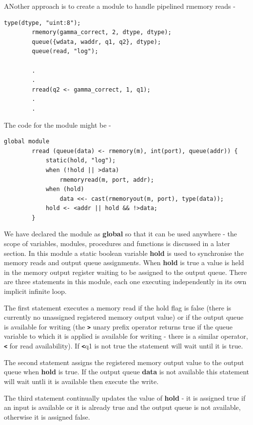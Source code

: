 \documentclass[10pt,a4paper,twoside,fleqn]{article}
\newcommand{\kwd}[1]{{\bf #1}} %
\newcommand{\var}[1]{{\bf #1}} %
\begin{document}
    ANother approach is to create a module to handle pipelined
    rmemory reads -
    \begin{lstlisting}[language=threepl]
        type(dtype, "uint:8");
        rmemory(gamma_correct, 2, dtype, dtype);
        queue({wdata, waddr, q1, q2}, dtype);
        queue(read, "log");
                
        .
        .
        rread(q2 <- gamma_correct, 1, q1);
        .
        .
    \end{lstlisting}
    The code for the module might be -
    \begin{lstlisting}[language=threepl]
        global module
        rread (queue(data) <- rmemory(m), int(port), queue(addr)) {
            static(hold, "log");
            when (!hold || >data)
                rmemoryread(m, port, addr);
            when (hold)
                data <<- cast(rmemoryout(m, port), type(data));
            hold <- <addr || hold && !>data;
        }
    \end{lstlisting}
    We have declared the module as \kwd{global} so that it can be used anywhere -
    the scope of variables, modules, procedures and functions is discussed in
    a later section. In this module a static boolean variable \var{hold} is used
    to synchronise the memory reads and output queue assignments. When \var{hold}
    is true a value is held in the memory output register waiting to be assigned
    to the output queue. There are three statements in this module, each one
    executing independently in its own implicit infinite loop.
    
    The first statement executes a memory read if the hold flag is false (there
    is currently no unassigned registered memory output value) or if the output
    queue is available for writing (the {\bf \verb'>'} unary prefix operator returns
    true if the queue variable to which it is applied is available for writing -
    there is a similar operator, {\bf \verb'<'} for read availability). If
    {\bf \verb'<'}q1 is not true the statement will wait until it is true.
    
    The second statement assigns the registered memory output value to the output
    queue when \var{hold} is true. If the output queue \var{data} is not available
    this statement will wait untli it is available then execute the write.
    
    The third statement continually updates the value of \var{hold} - it is
    assigned true if an input is available or it is already true and the output
    queue is not available, otherwise it is assigned false.
\end{document}
